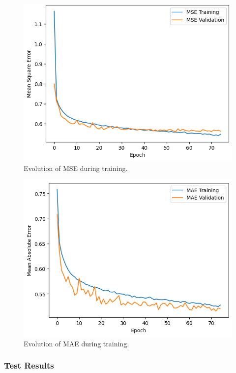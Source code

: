 \documentclass[sigconf,natbib=false]{acmart}
\begin{document}
\begin{figure}[h]
 \centering
 \includegraphics[width=\linewidth]{figs/mse_evolution.png}
 \caption{Evolution of MSE during training.}
\end{figure}

\begin{figure}[h]
 \centering
 \includegraphics[width=\linewidth]{figs/mae_evolution.png}
 \caption{Evolution of MAE during training.}
\end{figure}

\subsubsection{Test Results}
\end{document}
